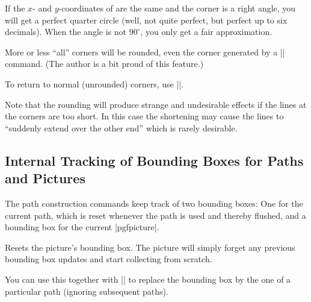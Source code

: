 \begin{command}{\pgfsetcornersarced{}}
    If the $x$- and $y$-coordinates of  are the same and the corner
    is a right angle, you will get a perfect quarter circle (well, not quite
    perfect, but perfect up to six decimals). When the angle is not $90^\circ$,
    you only get a fair approximation.

    More or less ``all'' corners will be rounded, even the corner generated by
    a |\pgfpathclose| command. (The author is a bit proud of this feature.)
\begin{codeexample}[]
\begin{pgfpicture}
  \pgfsetcornersarced{\pgfpoint{4pt}{4pt}}
  \pgfpathclose
\end{pgfpicture}
\end{codeexample}

    To return to normal (unrounded) corners, use
    |\pgfsetcornersarced{\pgfpointorigin}|.

    Note that the rounding will produce strange and undesirable effects if the
    lines at the corners are too short. In this case the shortening may cause
    the lines to ``suddenly extend over the other end'' which is rarely
    desirable.
\end{command}


\subsection{Internal Tracking of Bounding Boxes for Paths and Pictures}
\label{section-bb}

\makeatletter

The path construction commands keep track of two bounding boxes: One for the
current path, which is reset whenever the path is used and thereby flushed, and
a bounding box for the current |{pgfpicture}|.

\begin{command}{\pgfresetboundingbox}
    Resets the picture's bounding box. The picture will simply forget any
    previous bounding box updates and start collecting from scratch.

    You can use this together with || to
    replace the bounding box by the one of a particular path (ignoring
    subsequent paths).
\end{command}

